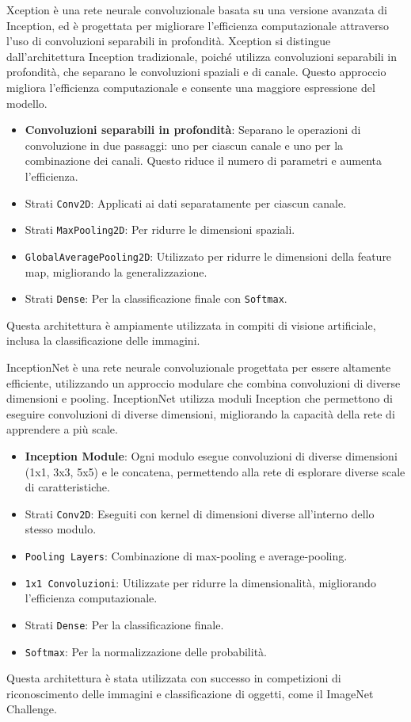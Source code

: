 Xception è una rete neurale convoluzionale basata su una versione avanzata di Inception, ed è progettata per migliorare l'efficienza computazionale attraverso l'uso di convoluzioni separabili in profondità.
Xception\cite{site:machinelearningtutorials} si distingue dall'architettura Inception tradizionale, poiché utilizza convoluzioni separabili in profondità, che separano le convoluzioni spaziali e di canale. Questo approccio migliora l'efficienza computazionale e consente una maggiore espressione del modello.
\begin{itemize}
    \item \textbf{Convoluzioni separabili in profondità}: Separano le operazioni di convoluzione in due passaggi: uno per ciascun canale e uno per la combinazione dei canali. Questo riduce il numero di parametri e aumenta l'efficienza.
    \item Strati \texttt{Conv2D}: Applicati ai dati separatamente per ciascun canale.
    \item Strati \texttt{MaxPooling2D}: Per ridurre le dimensioni spaziali.
    \item \texttt{GlobalAveragePooling2D}: Utilizzato per ridurre le dimensioni della feature map, migliorando la generalizzazione.
    \item Strati \texttt{Dense}: Per la classificazione finale con \texttt{Softmax}.
\end{itemize}
Questa architettura è ampiamente utilizzata in compiti di visione artificiale, inclusa la classificazione delle immagini.

InceptionNet è una rete neurale convoluzionale progettata per essere altamente efficiente, utilizzando un approccio modulare che combina convoluzioni di diverse dimensioni e pooling.
InceptionNet utilizza moduli Inception che permettono di eseguire convoluzioni di diverse dimensioni, migliorando la capacità della rete di apprendere a più scale.
\begin{itemize}
    \item \textbf{Inception Module}: Ogni modulo esegue convoluzioni di diverse dimensioni (1x1, 3x3, 5x5) e le concatena, permettendo alla rete di esplorare diverse scale di caratteristiche.
    \item Strati \texttt{Conv2D}: Eseguiti con kernel di dimensioni diverse all'interno dello stesso modulo.
    \item \texttt{Pooling Layers}: Combinazione di max-pooling e average-pooling.
    \item \texttt{1x1 Convoluzioni}: Utilizzate per ridurre la dimensionalità, migliorando l'efficienza computazionale.
    \item Strati \texttt{Dense}: Per la classificazione finale.
    \item \texttt{Softmax}: Per la normalizzazione delle probabilità.
\end{itemize}
Questa architettura è stata utilizzata con successo in competizioni di riconoscimento delle immagini e classificazione di oggetti, come il ImageNet Challenge.

